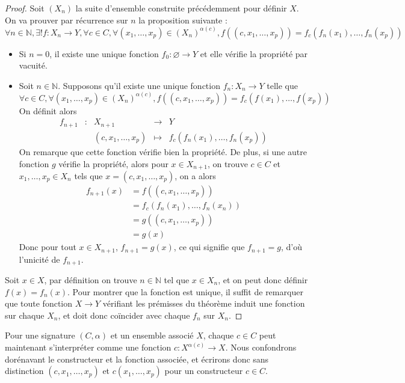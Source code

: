 \begin{proof}
  Soit $(X_n)$ la suite d'ensemble construite précédemment pour définir $X$. On
  va prouver par récurrence sur $n$ la proposition suivante :
  $$\forall n\in \mathbb N, \exists ! f : X_n \to Y, \forall c \in C,
  \forall (x_1,\ldots,x_p)\in (X_n)^{\alpha(c)}, f((c,x_1,\ldots,x_p))
  = f_c(f_n(x_1),\ldots,f_n(x_p))$$
  \begin{itemize}
  \item Si $n = 0$, il existe une unique fonction $f_0 : \varnothing \to Y$ et
    elle vérifie la propriété par vacuité.
  \item Soit $n \in \mathbb N$. Supposons qu'il existe une unique fonction
    $f_n : X_n \to Y$ telle que
    $$\forall c\in C, \forall (x_1,\ldots,x_p)\in (X_n)^{\alpha(c)},
    f((c,x_1,\ldots,x_p)) = f_c(f(x_1),\ldots,f(x_p))$$
    On définit alors
    $$\begin{array}{rcccl}
      f_{n+1} &:& X_{n+1} &\longrightarrow & Y \\
      & & (c,x_1,\ldots,x_p) & \longmapsto & f_c(f_n(x_1),\ldots,f_n(x_p))
    \end{array}$$
    On remarque que cette fonction vérifie bien la propriété. De plus, si une
    autre fonction $g$ vérifie la propriété, alors pour $x\in X_{n+1}$, on trouve
    $c\in C$ et $x_1,\ldots,x_p \in X_n$ tels que $x = (c,x_1,\ldots,x_p)$, on a
    alors
    \begin{align*}
      f_{n+1}(x) &= f((c,x_1,\ldots,x_p)) \\
      &= f_c(f_n(x_1),\ldots,f_n(x_n)) \\
      &= g((c,x_1,\ldots,x_p))\\
      &= g (x)
    \end{align*}
    Donc pour tout $x\in X_{n+1}$, $f_{n+1} = g(x)$, ce qui signifie que
    $f_{n+1} = g$, d'où l'unicité de $f_{n+1}$.
  \end{itemize}

  Soit $x \in X$, par définition on trouve $n\in \mathbb N$ tel que $x \in X_n$,
  et on peut donc définir $f(x) = f_n(x)$. Pour montrer que la fonction est
  unique, il suffit de remarquer que toute fonction $X \to Y$ vérifiant les
  prémisses du théorème induit une fonction sur chaque $X_n$, et doit donc
  coïncider avec chaque $f_n$ sur $X_n$.
\end{proof}

\begin{remark}
  Pour une signature $(C,\alpha)$ et un ensemble associé $X$, chaque $c\in C$
  peut maintenant s'interpréter comme une fonction $c : X^{\alpha(c)}\to X$. Nous
  confondrons dorénavant le constructeur et la fonction associée, et écrirons
  donc sans distinction $(c,x_1,\ldots,x_p)$ et $c(x_1,\ldots,x_p)$ pour un
  constructeur $c \in C$.
\end{remark}

